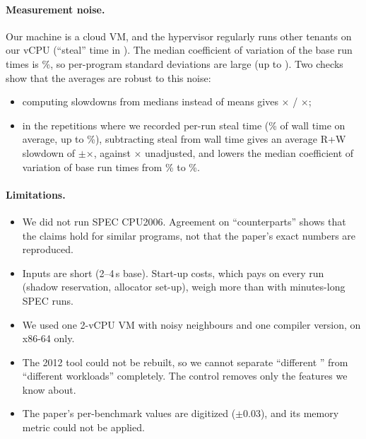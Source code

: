 \paragraph{Measurement noise.}
Our machine is a cloud VM, and the hypervisor regularly runs other tenants on
our vCPU (``steal'' time in ). The median coefficient of
variation of the base run times is \MedBaseCV\%, so per-program standard
deviations are large (up to \MaxRWsd). Two checks show that the averages are
robust to this noise:
\begin{itemize}
\item computing slowdowns from medians instead of means gives
\MedianAvgRW$\times$ / \MedianAvgWO$\times$;
\item in the \StealRuns{} repetitions where we recorded per-run steal time
(\StealPct\% of wall time on average, up to \StealMaxPct\%), subtracting
steal from wall time gives an average R+W slowdown of
\StealAdjRW$\pm$\StealAdjRWsd$\times$, against \StealRawRW$\times$
unadjusted, and lowers the median coefficient of variation of base run
times from \StealCVraw\% to \StealCVadj\%.
\end{itemize}

\paragraph{Limitations.}
\begin{itemize}
\item We did not run SPEC CPU2006. Agreement on ``counterparts'' shows that
the claims hold for similar programs, not that the paper's exact numbers are
reproduced.
\item Inputs are short (2--4\,s base). Start-up costs, which \asan{} pays on
every run (shadow reservation, allocator set-up), weigh more than with
minutes-long SPEC runs.
\item We used one 2-vCPU VM with noisy neighbours and one compiler version,
on x86-64 only.
\item The 2012 tool could not be rebuilt, so we cannot separate ``different
\asan{}'' from ``different workloads'' completely. The  control
removes only the features we know about.
\item The paper's per-benchmark values are digitized ($\pm$0.03), and its
memory metric could not be applied.
\end{itemize}
